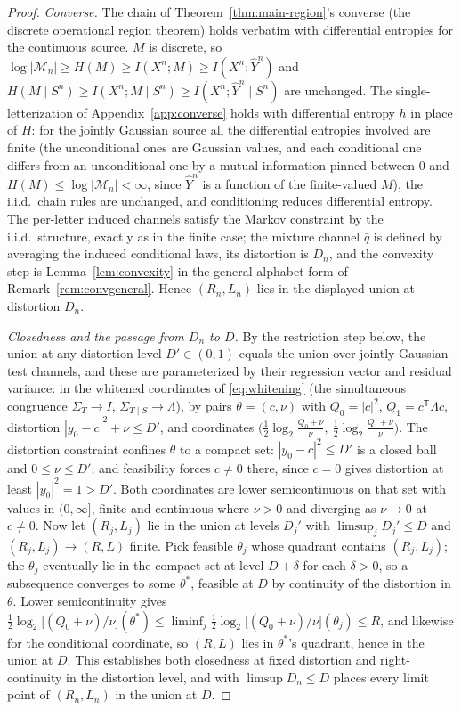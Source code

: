 \documentclass[11pt,onecolumn]{IEEEtran}
\newcommand{\hY}{\widehat{Y}}
\begin{document}
\begin{proof}
\emph{Converse.} The chain of Theorem~\ref{thm:main-region}'s converse
(the discrete operational region theorem) holds verbatim with
differential entropies for the continuous source.
$M$ is discrete, so $\log|\mathcal M_n|\ge H(M)\ge I(X^n;M)\ge
I(X^n;\hY^n)$ and $H(M\mid S^n)\ge I(X^n;M\mid S^n)\ge
I(X^n;\hY^n\mid S^n)$ are unchanged. The single-letterization of
Appendix~\ref{app:converse} holds with differential entropy $h$ in place of $H$: for the
jointly Gaussian source all the differential entropies involved are
finite (the unconditional ones are Gaussian values, and each
conditional one differs from an unconditional one by a mutual
information pinned between $0$ and
$H(M)\le\log|\mathcal M_n|<\infty$, since $\hY^n$ is a function of the
finite-valued $M$), the i.i.d.\ chain rules are unchanged, and
conditioning reduces differential entropy. The per-letter induced channels satisfy the
Markov constraint by the i.i.d.\ structure, exactly as in the finite
case; the mixture channel $\bar q$ is defined by averaging the induced
conditional laws, its distortion is $D_n$, and the convexity step is
Lemma~\ref{lem:convexity} in the general-alphabet form of
Remark~\ref{rem:convgeneral}. Hence
$(R_n,L_n)$ lies in the displayed union at distortion $D_n$.

\emph{Closedness and the passage from $D_n$ to $D$.} By the restriction
step below, the union at any distortion level $D'\in(0,1)$ equals the
union over jointly Gaussian test channels, and these are parameterized
by their regression vector and residual variance: in the whitened
coordinates of \eqref{eq:whitening} (the simultaneous congruence
$\Sigma_T\to I$, $\Sigma_{T\mid S}\to\Lambda$), by pairs
$\theta=(c,\nu)$ with
$Q_0=|c|^2$, $Q_1=c^{\mathsf T}\Lambda c$, distortion
$|y_0-c|^2+\nu\le D'$, and coordinates
$\bigl(\tfrac12\log_2\tfrac{Q_0+\nu}{\nu},\
\tfrac12\log_2\tfrac{Q_1+\nu}{\nu}\bigr)$. The distortion constraint
confines $\theta$ to a compact set: $|y_0-c|^2\le D'$ is a closed ball
and $0\le\nu\le D'$; and feasibility forces $c\ne0$ there, since $c=0$
gives distortion at least $|y_0|^2=1>D'$. Both coordinates are lower
semicontinuous on that set with values in $(0,\infty]$, finite and
continuous where $\nu>0$ and diverging as $\nu\to0$ at $c\ne0$. Now let
$(R_j,L_j)$ lie in the union at levels $D_j'$ with
$\limsup_jD_j'\le D$ and $(R_j,L_j)\to(R,L)$ finite. Pick feasible
$\theta_j$ whose quadrant contains $(R_j,L_j)$; the $\theta_j$
eventually lie in the compact set at level $D+\delta$ for each
$\delta>0$, so a subsequence converges to some $\theta^*$, feasible at
$D$ by continuity of the distortion in $\theta$. Lower semicontinuity
gives $\tfrac12\log_2\bigl[(Q_0+\nu)/\nu\bigr](\theta^*)\le
\liminf_j\tfrac12\log_2\bigl[(Q_0+\nu)/\nu\bigr](\theta_j)\le R$, and
likewise for the conditional coordinate, so $(R,L)$ lies in
$\theta^*$'s quadrant, hence in the union at $D$. This establishes
both closedness at fixed distortion and right-continuity in the
distortion level, and with $\limsup D_n\le D$ places every limit point
of $(R_n,L_n)$ in the union at $D$.


\end{proof}
\end{document}
